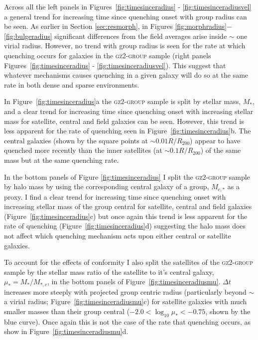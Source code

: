 Across all the left panels in Figures~\ref{fig:timesinceradius} - \ref{fig:timesinceradiusvel} a general trend for increasing time since quenching onset with group radius can be seen. As earlier in Section \ref{sec:resmorph}, in Figures \ref{fig:morphradius}$-$\ref{fig:bulgeradius} significant differences from the field averages arise inside $\sim$ one virial radius. However, no trend with group radius is seen for the rate at which quenching occurs for galaxies in the \textsc{gz2-group} sample (right panels Figures~\ref{fig:timesinceradius} - \ref{fig:timesinceradiusvel}). This suggest that whatever mechanisms causes quenching in a given galaxy will do so at the same rate in both dense and sparse environments. 

In Figure~\ref{fig:timesinceradius}a the \textsc{gz2-group} sample is split by stellar mass, $M_*$, and a clear trend for increasing time since quenching onset with increasing stellar mass for satellite, central and field galaxies can be seen. However, this trend is less apparent for the rate of quenching seen in Figure~\ref{fig:timesinceradius}b. The central galaxies (shown by the square points at $\sim 0.01 R/R_{200}$) appear to have quenched more recently than the inner satellites (at $\sim0.1R/R_{200}$) of the same mass but at the same quenching rate. 

In the bottom panels of Figure \ref{fig:timesinceradius} I split the \textsc{gz2-group} sample by halo mass by using the corresponding central galaxy of a group, $M_{c,*}$ as a proxy. I find a clear trend for increasing time since quenching onset with increasing stellar mass of the group central for satellite, central and field galaxies (Figure~\ref{fig:timesinceradius}c) but once again this trend is less apparent for the rate of quenching (Figure~\ref{fig:timesinceradius}d) suggesting the halo mass does not affect which quenching mechanism acts upon either central or satellite galaxies. 

To account for the effects of conformity \citep[i.e. that satellites of higher mass tend to be found in higher mass halos]{citationbomb} I also split the satellites of the \textsc{gz2-group} sample by the stellar mass ratio of the satellite to it's central galaxy, $\mu_* = M_*/M_{*,c}$, in the bottom panels of Figure~\ref{fig:timesinceradiusmu}. $\Delta t $ increases more steeply with projected group centric radius (particularly beyond $\sim$ a virial radius; Figure~\ref{fig:timesinceradiusmu}c) for satellite galaxies with much smaller masses than their group central ($-2.0 < \log_{10}\mu_* < -0.75$, shown by the blue curve). Once again this is not the case of the rate that quenching occurs, as show in Figure~\ref{fig:timesinceradiusmu}d. 

